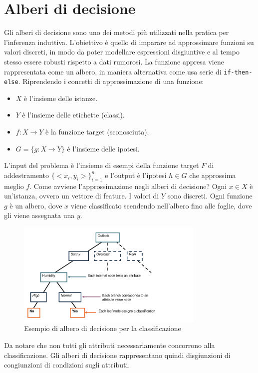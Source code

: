 \chapter{Alberi di decisione}
Gli alberi di decisione sono uno dei metodi più utilizzati nella pratica per l'inferenza induttiva.
L'obiettivo è quello di imparare ad approssimare funzioni su valori discreti, in modo da poter modellare espressioni disgiuntive e al tempo stesso essere robusti rispetto a dati rumorosi.
La funzione appresa viene rappresentata come un albero, in maniera alternativa come usa serie di \texttt{if-then-else}.
Riprendendo i concetti di approssimazione di una funzione:
\begin{itemize}
	\item $X$ è l'insieme delle istanze.
	\item $Y$ è l'insieme delle etichette (classi).
	\item $f: X \rightarrow Y$ è la funzione target (sconosciuta).
	\item $G=\{g: X \rightarrow Y\}$ è l'insieme delle ipotesi.
\end{itemize}
L'input del problema è l'insieme di esempi della funzione target $F$ di addestramento
$\{<x_i, y_i>\}_{i=1}^n$
e l'output è l'ipotesi $h \in G$ che approssima meglio $f$.
Come avviene l'approssimazione negli alberi di decisione?
Ogni $x\in X$ è un'istanza, ovvero un vettore di feature. I valori di $Y$ sono discreti.
Ogni funzione $g$ è un albero, dove $x$ viene classificato scendendo nell'albero fino alle foglie, dove gli viene assegnata una $y$.
\begin{figure}[h]
	\centering
	\includegraphics[width=0.8\textwidth]{pictures/decisionTree.png}
	\caption{Esempio di albero di decisione per la classificazione }
\end{figure}
Da notare che non tutti gli attributi necessariamente concorrono alla classificazione.
Gli alberi di decisione rappresentano quindi disgiunzioni di congiunzioni di condizioni sugli attributi.
